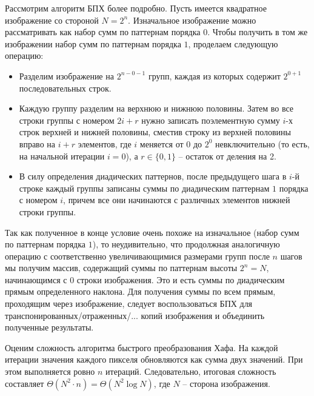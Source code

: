 Рассмотрим алгоритм БПХ более подробно. Пусть имеется квадратное изображение со стороной $N = 2^n$. Изначальное изображение можно рассматривать как набор сумм по паттернам порядка $0$. Чтобы получить в том же изображении набор сумм по паттернам порядка $1$, проделаем следующую операцию:
\begin{itemize}
\item
    Разделим изображение на $2^{n-0-1}$ групп, каждая из которых содержит $2^{0+1}$ последовательных строк.
\item
    Каждую группу разделим на верхнюю и нижнюю половины. Затем во все строки группы с номером $2i+r$ нужно записать поэлементную сумму $i$-х строк верхней и нижней половины, сместив строку из верхней половины вправо на $i+r$ элементов, где $i$ меняется от $0$ до $2^{0}$ невключительно (то есть, на начальной итерации $i=0$), а $r \in \{0, 1\}$ -- остаток от деления на 2.
\item
    В силу определения диадических паттернов, после предыдущего шага в $i$-й строке каждый группы записаны суммы по диадическим паттернам $1$ порядка с номером $i$, причем все они начинаются с различных элементов нижней строки группы.
\end{itemize}

Так как полученное в конце условие очень похоже на изначальное (набор сумм по паттернам порядка $1$), то неудивительно, что продолжная аналогичную операцию с соответственно увеличивающимися размерами групп после $n$ шагов мы получим массив, содержащий суммы по паттернам высоты $2^n = N$, начинающимся с $0$ строки изображения. Это и есть суммы по диадическим прямым определенного наклона. Для получения суммы по всем прямым, проходящим через изображение, следует воспользоваться БПХ для транспонированных/отраженных/... копий изображения и объединить полученные результаты.

Оценим сложность алгоритма быстрого преобразования Хафа. На каждой итерации значения каждого пикселя обновляются как сумма двух значений. При этом выполняется ровно $n$ итераций. Следовательно, итоговая сложность составляет $\Theta(N^2 \cdot n) = \Theta(N^2 \log N)$, где $N$ -- сторона изображения.
